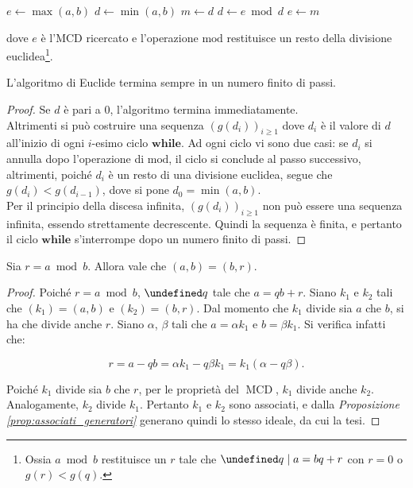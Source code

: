 \documentclass[a4paper]{article}
\DeclareMathOperator{\MCD}{MCD}
\let\oldexists\exists
\let\exists\undefined
\DeclareMathOperator{\exists}{\oldexists}
\begin{document}
\newpage

\begin{algorithm}
    $e \gets \max(a,b)$\;
    $d \gets \min(a,b)$\;
    \BlankLine\BlankLine
    {
        $m \gets d$\;
        $d \gets e \bmod d$\;
        $e \gets m$\;
    }
\end{algorithm}

dove $e$ è l'MCD ricercato e l'operazione $\mathrm{mod}$ restituisce un resto della
divisione euclidea\footnote{Ossia $a \bmod b$ restituisce un $r$ tale che $\exists q
        \mid a = bq+r$ con $r=0$ o $g(r)<g(q)$.}.

\begin{lemma}
    \label{lem:euclide_finito}
    L'algoritmo di Euclide termina sempre in un numero finito di passi.
\end{lemma}

\begin{proof}
    Se $d$ è pari a $0$, l'algoritmo termina immediatamente. \\

    Altrimenti si può costruire una sequenza $(g(d_i))_{i\geq1}$ dove $d_i$ è il valore di $d$ all'inizio
    di ogni $i$-esimo ciclo $\textbf{while}$. Ad ogni ciclo vi sono due casi: se $d_i$ si annulla dopo
    l'operazione di $\mathrm{mod}$, il ciclo si conclude al passo successivo, altrimenti,
    poiché $d_i$ è un resto di una divisione euclidea, segue che $g(d_i)<g(d_{i-1})$, dove
    si pone $d_{0}=\min(a, b)$. \\

    Per il principio della discesa infinita, $(g(d_i))_{i\geq1}$ non può essere
    una sequenza infinita, essendo strettamente decrescente. Quindi la sequenza è
    finita, e pertanto il ciclo $\textbf{while}$ s'interrompe dopo un numero finito
    di passi.
\end{proof}

\begin{lemma}
    \label{lem:generatori_euclide}
    Sia $r = a \bmod b$. Allora vale che $(a,b)=(b,r)$.
\end{lemma}

\begin{proof}
    Poiché $r = a \bmod b$, $\exists q$ tale che $a = qb + r$.
    Siano $k_1$ e $k_2$ tali che $(k_1)=(a,b)$ e $(k_2)=(b,r)$. Dal
    momento che $k_1$ divide sia $a$ che $b$, si ha che divide anche
    $r$. Siano $\alpha$, $\beta$ tali che $a = \alpha k_1$ e
    $b = \beta k_1$. Si verifica infatti che:

    \[ r = a - qb = \alpha k_1 - q \beta k_1 = k_1 (\alpha - q \beta). \]

    Poiché $k_1$ divide sia $b$ che $r$, per le proprietà del $\MCD$,
    $k_1$ divide anche $k_2$. Analogamente, $k_2$ divide $k_1$. Pertanto
    $k_1$ e $k_2$ sono associati, e dalla \textit{Proposizione \ref{prop:associati_generatori}} generano quindi lo stesso ideale, da
    cui la tesi.
\end{proof}
\end{document}
